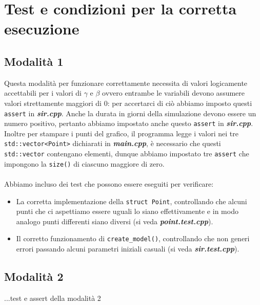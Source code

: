 \documentclass[a4paper,10 pt]{article}
\begin{document}
\section{Test e condizioni per la corretta esecuzione}
\subsection{Modalità 1}
Questa modalità per funzionare correttamente necessita di valori logicamente accettabili per i valori di $\gamma$ e $\beta$ ovvero entrambe le variabili devono assumere valori strettamente maggiori di 0: per accertarci di ciò abbiamo imposto questi \verb!assert! in \textbf{\textit{sir.cpp}}. Anche la durata in giorni della simulazione devono essere un numero positivo, pertanto abbiamo impostato anche questo \verb!assert! in \textbf{\textit{sir.cpp}}. Inoltre per stampare i punti del grafico, il programma legge i valori nei tre \verb!std::vector<Point>! dichiarati in \textbf{\textit{main.cpp}}, è necessario che questi  \verb!std::vector! contengano elementi, dunque abbiamo impostato tre  \verb!assert! che impongono la  \verb!size()! di ciascuno maggiore di zero.
\ \\
\ \\
Abbiamo incluso dei test che possono essere eseguiti per verificare:
\begin{itemize}
\item La corretta implementazione della \verb!struct Point!, controllando che alcuni punti che ci aspettiamo essere uguali lo siano effettivamente e in modo analogo punti differenti siano diversi (si veda  \textbf{\textit{point.test.cpp}}).
\item Il corretto funzionamento di \verb!create_model()!, controllando che non generi errori passando alcuni parametri iniziali casuali (si veda \textbf{\textit{sir.test.cpp}}).
 \end{itemize}

\subsection{Modalità 2}

...test e assert della modalità 2
\end{document}
